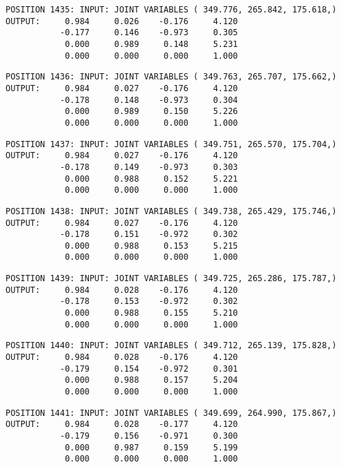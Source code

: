 \begin{verbatim}
POSITION 1435: INPUT: JOINT VARIABLES ( 349.776, 265.842, 175.618,)
OUTPUT:     0.984     0.026    -0.176     4.120
           -0.177     0.146    -0.973     0.305
            0.000     0.989     0.148     5.231
            0.000     0.000     0.000     1.000
\end{verbatim} \pagebreak[1]\begin{verbatim}
POSITION 1436: INPUT: JOINT VARIABLES ( 349.763, 265.707, 175.662,)
OUTPUT:     0.984     0.027    -0.176     4.120
           -0.178     0.148    -0.973     0.304
            0.000     0.989     0.150     5.226
            0.000     0.000     0.000     1.000
\end{verbatim} \pagebreak[1]\begin{verbatim}
POSITION 1437: INPUT: JOINT VARIABLES ( 349.751, 265.570, 175.704,)
OUTPUT:     0.984     0.027    -0.176     4.120
           -0.178     0.149    -0.973     0.303
            0.000     0.988     0.152     5.221
            0.000     0.000     0.000     1.000
\end{verbatim} \pagebreak[1]\begin{verbatim}
POSITION 1438: INPUT: JOINT VARIABLES ( 349.738, 265.429, 175.746,)
OUTPUT:     0.984     0.027    -0.176     4.120
           -0.178     0.151    -0.972     0.302
            0.000     0.988     0.153     5.215
            0.000     0.000     0.000     1.000
\end{verbatim} \pagebreak[1]\begin{verbatim}
POSITION 1439: INPUT: JOINT VARIABLES ( 349.725, 265.286, 175.787,)
OUTPUT:     0.984     0.028    -0.176     4.120
           -0.178     0.153    -0.972     0.302
            0.000     0.988     0.155     5.210
            0.000     0.000     0.000     1.000
\end{verbatim} \pagebreak[1]\begin{verbatim}
POSITION 1440: INPUT: JOINT VARIABLES ( 349.712, 265.139, 175.828,)
OUTPUT:     0.984     0.028    -0.176     4.120
           -0.179     0.154    -0.972     0.301
            0.000     0.988     0.157     5.204
            0.000     0.000     0.000     1.000
\end{verbatim} \pagebreak[1]\begin{verbatim}
POSITION 1441: INPUT: JOINT VARIABLES ( 349.699, 264.990, 175.867,)
OUTPUT:     0.984     0.028    -0.177     4.120
           -0.179     0.156    -0.971     0.300
            0.000     0.987     0.159     5.199
            0.000     0.000     0.000     1.000
\end{verbatim} \pagebreak[1]\begin{verbatim}

\end{verbatim}
